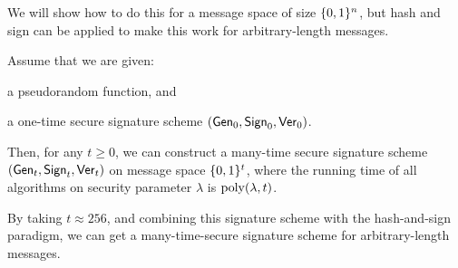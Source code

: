 We will show how to do this for a message space of
size $\{0,1\}^n$, but hash and sign can be applied to
make this work for arbitrary-length messages. 


\begin{claim}
Assume that we are given:
\begin{compactitem}
  \item a pseudorandom function, and 
  \item a one-time secure signature scheme $(\mathsf{Gen}_0, \mathsf{Sign}_0, \mathsf{Ver}_0)$.
\end{compactitem}
Then, for any $t \geq 0$, we can construct a many-time secure 
signature scheme $(\mathsf{Gen}_t, \mathsf{Sign}_t, \mathsf{Ver}_t)$ on message space $\{0,1\}^{t}$,
where the running time of all algorithms on 
security parameter $\lambda$ is $\operatorname{poly}(\lambda, t)$.
\end{claim}

By taking $t \approx 256$, and combining this signature
scheme with the hash-and-sign paradigm, 
we can get a many-time-secure signature scheme 
for arbitrary-length messages.

